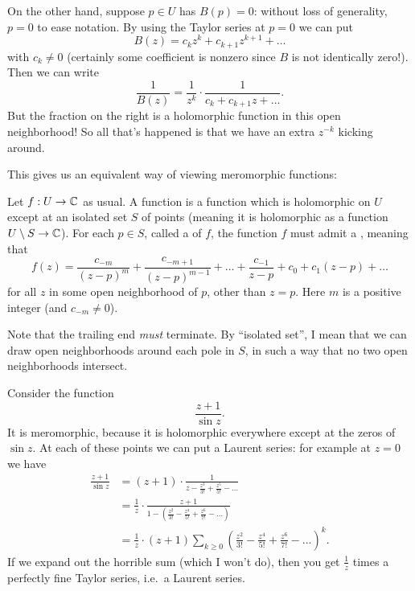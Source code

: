 On the other hand, suppose $p \in U$ has $B(p) = 0$: without loss of generality, $p=0$
to ease notation.
By using the Taylor series at $p=0$ we can put
\[ B(z) = c_k z^k + c_{k+1} z^{k+1} + \dots \]
with $c_k \neq 0$
(certainly some coefficient is nonzero since $B$ is not identically zero!).
Then we can write
\[ \frac{1}{B(z)} = \frac{1}{z^k} \cdot \frac{1}{c_k + c_{k+1}z + \dots}. \]
But the fraction on the right is a
holomorphic function in this open neighborhood!
So all that's happened is that we have an extra $z^{-k}$ kicking around.


This gives us an equivalent way of viewing meromorphic functions:

\begin{definition}
	Let $f : U \to \mathbb C$ as usual.
	A  function is a
	function which is holomorphic on $U$
	except at an isolated set $S$ of points
	(meaning it is holomorphic as a function $U \setminus S \to \mathbb C$).
	For each $p \in S$, called a  of $f$,
	the function $f$ must admit a ,
	meaning that
	\[
		f(z) =
		\frac{c_{-m}}{(z-p)^m}
		+ \frac{c_{-m+1}}{(z-p)^{m-1}}
		+ \dots
		+ \frac{c_{-1}}{z-p} + c_0 + c_1 (z-p) + \dots
	\]
	for all $z$ in some open neighborhood of $p$,
	other than $z = p$.
	Here $m$ is a positive integer (and $c_{-m} \neq 0$).
\end{definition}
Note that the trailing end \emph{must} terminate.
By ``isolated set'', I mean that we can draw
open neighborhoods around each pole in $S$,
in such a way that no two open neighborhoods intersect.

\begin{example}
	Consider the function \[ \frac{z+1}{\sin z}. \]
	It is meromorphic, because it is holomorphic everywhere except at the zeros of $\sin z$.
	At each of these points we can put a Laurent series: for example at $z=0$ we have
	\begin{align*}
		\frac{z+1}{\sin z}
		&= (z+1) \cdot \frac{1}{z - \frac{z^3}{3!} + \frac{z^5}{5!} - \dots} \\
		&= \frac 1z \cdot \frac{z+1}{1 - \left(%
			\frac{z^2}{3!} - \frac{z^4}{5!} + \frac{z^6}{7!} - \dots \right)} \\
		&= \frac 1z \cdot (z+1) \sum_{k \ge 0} \left( %
			\frac{z^2}{3!}-\frac{z^4}{5!}+\frac{z^6}{7!}-\dots \right)^k.
	\end{align*}
	If we expand out the horrible sum (which I won't do),
	then you get $\frac 1z$ times a perfectly
	fine Taylor series, i.e.\ a Laurent series.
\end{example}

